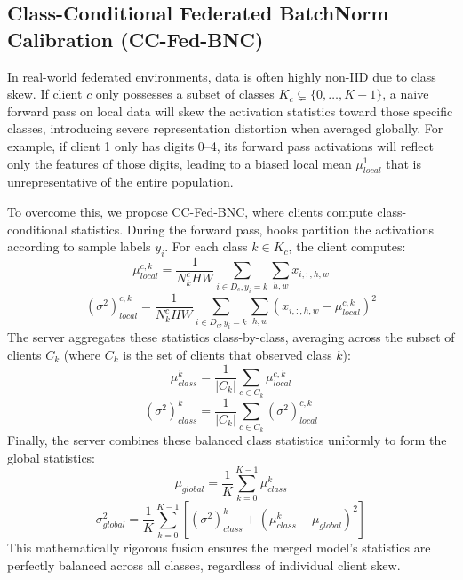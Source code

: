 \documentclass{article}
\theoremstyle{plain}
\theoremstyle{definition}
\theoremstyle{remark}
\begin{document}
\subsection{Class-Conditional Federated BatchNorm Calibration (CC-Fed-BNC)}
In real-world federated environments, data is often highly non-IID due to class skew. If client $c$ only possesses a subset of classes $K_c \subsetneq \{0, \dots, K-1\}$, a naive forward pass on local data will skew the activation statistics toward those specific classes, introducing severe representation distortion when averaged globally. For example, if client 1 only has digits 0--4, its forward pass activations will reflect only the features of those digits, leading to a biased local mean $\mu_{local}^1$ that is unrepresentative of the entire population.

To overcome this, we propose CC-Fed-BNC, where clients compute class-conditional statistics. During the forward pass, hooks partition the activations according to sample labels $y_i$. For each class $k \in K_c$, the client computes:
\begin{equation}
    \mu_{local}^{c,k} = \frac{1}{N_k^c HW} \sum_{i \in D_c, y_i = k} \sum_{h,w} x_{i, :, h, w}
\end{equation}
\begin{equation}
    (\sigma^2)_{local}^{c,k} = \frac{1}{N_k^c HW} \sum_{i \in D_c, y_i = k} \sum_{h,w} (x_{i, :, h, w} - \mu_{local}^{c,k})^2
\end{equation}
The server aggregates these statistics class-by-class, averaging across the subset of clients $C_k$ (where $C_k$ is the set of clients that observed class $k$):
\begin{equation}
    \mu_{class}^k = \frac{1}{|C_k|} \sum_{c \in C_k} \mu_{local}^{c,k}
\end{equation}
\begin{equation}
    (\sigma^2)_{class}^k = \frac{1}{|C_k|} \sum_{c \in C_k} (\sigma^2)_{local}^{c,k}
\end{equation}
Finally, the server combines these balanced class statistics uniformly to form the global statistics:
\begin{equation}
    \mu_{global} = \frac{1}{K} \sum_{k=0}^{K-1} \mu_{class}^k
\end{equation}
\begin{equation}
    \sigma_{global}^2 = \frac{1}{K} \sum_{k=0}^{K-1} \left[ (\sigma^2)_{class}^k + (\mu_{class}^k - \mu_{global})^2 \right]
\end{equation}
This mathematically rigorous fusion ensures the merged model's statistics are perfectly balanced across all classes, regardless of individual client skew.
\end{document}
